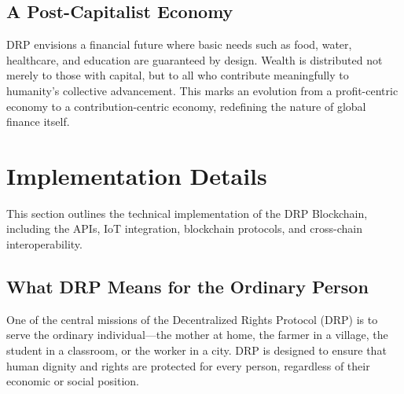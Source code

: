 \documentclass[11pt,a4paper]{article}
\begin{document}
\subsection{A Post-Capitalist Economy}
DRP envisions a financial future where basic needs such as food, water, healthcare, and education are guaranteed by design. 
Wealth is distributed not merely to those with capital, but to all who contribute meaningfully to humanity’s collective advancement.
This marks an evolution from a profit-centric economy to a contribution-centric economy, redefining the nature of global finance itself.



\section{Implementation Details}

This section outlines the technical implementation of the DRP Blockchain, including the APIs, IoT integration, blockchain protocols, and cross-chain interoperability.

\subsection{What DRP Means for the Ordinary Person}

One of the central missions of the Decentralized Rights Protocol (DRP) is to serve the ordinary individual---the mother at home, the farmer in a village, the student in a classroom, or the worker in a city. DRP is designed to ensure that human dignity and rights are protected for every person, regardless of their economic or social position. 
\end{document}
